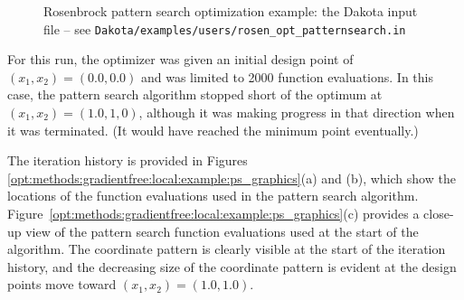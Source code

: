 \begin{figure}[ht!]
  \centering
  \begin{bigbox}
    \begin{small}
    \end{small}
  \end{bigbox}
  \caption{Rosenbrock pattern search optimization example: the Dakota input file --
see \texttt{Dakota/examples/users/rosen\_opt\_patternsearch.in} }
  \label{opt:methods:gradientfree:local:example:ps}
\end{figure}

For this run, the optimizer was given an initial design point of
$(x_1,x_2) = (0.0,0.0)$ and was limited to 2000 function
evaluations. In this case, the pattern search algorithm stopped short
of the optimum at $(x_1,x_2) = (1.0,1,0)$, although it was making
progress in that direction when it was terminated. (It would have
reached the minimum point eventually.)

The iteration history is provided in Figures~
\ref{opt:methods:gradientfree:local:example:ps_graphics}(a) and (b),
which show the locations of the function evaluations used in the
pattern search algorithm.
Figure~\ref{opt:methods:gradientfree:local:example:ps_graphics}(c)
provides a close-up view of the pattern search function evaluations
used at the start of the algorithm. The coordinate pattern is clearly
visible at the start of the iteration history, and the decreasing size
of the coordinate pattern is evident at the design points move toward
$(x_1,x_2) = (1.0,1.0)$.

